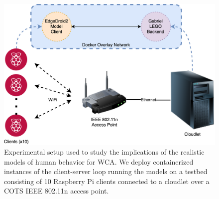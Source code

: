 \begin{figure}
    \centering
    \includegraphics[width=\columnwidth]{figs/EdgeDroid2ExperimentalSetup.png}
    \caption{%
        Experimental setup used to study the implications of the realistic models of human behavior for \ac{WCA}.
        We deploy containerized instances of the client-server loop running the models on a testbed consisting of \num{10} Raspberry Pi clients connected to a cloudlet over a \ac{COTS} \acs{IEEE} \num{802.11}n access point.
    }\label{fig:expsetup}
\end{figure}


